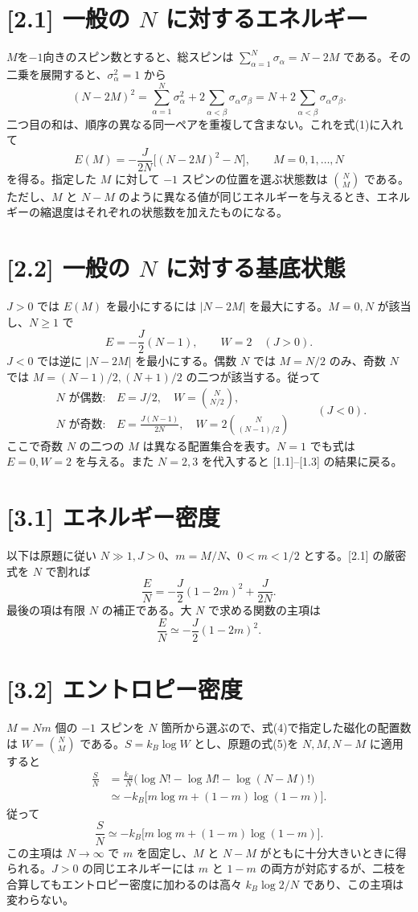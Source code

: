 \documentclass[11pt,a4paper]{article}
\begin{document}
\section*{[2.1] 一般の $N$ に対するエネルギー}
$M$を$-1$向きのスピン数とすると、総スピンは $\sum_{\alpha=1}^N\sigma_\alpha=N-2M$ である。その二乗を展開すると、$\sigma_\alpha^2=1$ から
\[
(N-2M)^2
=\sum_{\alpha=1}^N\sigma_\alpha^2
 +2\sum_{\alpha<\beta}\sigma_\alpha\sigma_\beta
=N+2\sum_{\alpha<\beta}\sigma_\alpha\sigma_\beta.
\]
二つ目の和は、順序の異なる同一ペアを重複して含まない。これを式(1)に入れて
\[
\boxed{E(M)=-\frac{J}{2N}\bigl[(N-2M)^2-N\bigr]},
\qquad M=0,1,\ldots,N
\]
を得る。指定した $M$ に対して $-1$ スピンの位置を選ぶ状態数は $\binom{N}{M}$ である。ただし、$M$ と $N-M$ のように異なる値が同じエネルギーを与えるとき、エネルギーの縮退度はそれぞれの状態数を加えたものになる。

\section*{[2.2] 一般の $N$ に対する基底状態}
$J>0$ では $E(M)$ を最小にするには $|N-2M|$ を最大にする。$M=0,N$ が該当し、$N\geq1$ で
\[
\boxed{E=-\frac{J}{2}(N-1),\qquad W=2\quad(J>0)}.
\]
$J<0$ では逆に $|N-2M|$ を最小にする。偶数 $N$ では $M=N/2$ のみ、奇数 $N$ では $M=(N-1)/2,(N+1)/2$ の二つが該当する。従って
\[
\boxed{\begin{array}{ll}
N\text{ が偶数}:& E=J/2,\quad W=\displaystyle\binom{N}{N/2},\\[2mm]
N\text{ が奇数}:& E=\displaystyle\frac{J(N-1)}{2N},\quad
 W=\displaystyle 2\binom{N}{(N-1)/2}
\end{array}\qquad(J<0).}
\]
ここで奇数 $N$ の二つの $M$ は異なる配置集合を表す。$N=1$ でも式は $E=0,W=2$ を与える。また $N=2,3$ を代入すると [1.1]–[1.3] の結果に戻る。

\section*{[3.1] エネルギー密度}
以下は原題に従い $N\gg1,J>0$、$m=M/N$、$0<m<1/2$ とする。[2.1] の厳密式を $N$ で割れば
\[
\frac{E}{N}=-\frac{J}{2}(1-2m)^2+\frac{J}{2N}.
\]
最後の項は有限 $N$ の補正である。大 $N$ で求める関数の主項は
\[
\boxed{\frac{E}{N}\simeq-\frac{J}{2}(1-2m)^2.}
\]

\section*{[3.2] エントロピー密度}
$M=Nm$ 個の $-1$ スピンを $N$ 箇所から選ぶので、式(4)で指定した磁化の配置数は $W=\binom{N}{M}$ である。$S=k_B\log W$ とし、原題の式(5)を $N,M,N-M$ に適用すると
\begin{align*}
\frac{S}{N}
&=\frac{k_B}{N}\bigl(\log N!-\log M!-\log(N-M)!\bigr)\\
&\simeq-k_B\bigl[m\log m+(1-m)\log(1-m)\bigr].
\end{align*}
従って
\[
\boxed{\frac{S}{N}\simeq-k_B\bigl[m\log m+(1-m)\log(1-m)\bigr].}
\]
この主項は $N\to\infty$ で $m$ を固定し、$M$ と $N-M$ がともに十分大きいときに得られる。$J>0$ の同じエネルギーには $m$ と $1-m$ の両方が対応するが、二枝を合算してもエントロピー密度に加わるのは高々 $k_B\log2/N$ であり、この主項は変わらない。
\end{document}
